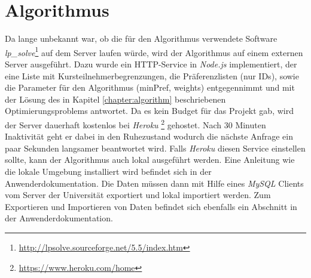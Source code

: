     \section{Algorithmus}
	Da lange unbekannt war, ob die für den Algorithmus verwendete Software \textit{lp\_solve}\footnote{\href{http://lpsolve.sourceforge.net/5.5/index.htm}{http://lpsolve.sourceforge.net/5.5/index.htm}} auf dem Server laufen würde, wird der Algorithmus auf einem externen Server ausgeführt. 
    Dazu wurde ein HTTP-Service in \textit{Node.js} implementiert, der eine Liste mit Kursteilnehmerbegrenzungen, die Präferenzlisten (nur IDs), sowie die Parameter für den Algorithmus (minPref, weights) entgegennimmt und mit der Lösung des in Kapitel \ref{chapter:algorithm} beschriebenen Optimierungsproblems antwortet.	
    Da es kein Budget für das Projekt gab, wird der Server dauerhaft kostenlos bei \textit{Heroku} \footnote{\href{https://www.heroku.com/home}{https://www.heroku.com/home}} gehostet. 
    Nach 30 Minuten Inaktivität geht er dabei in den Ruhezustand wodurch die nächste Anfrage ein paar Sekunden langsamer beantwortet wird. 
    Falls \textit{Heroku} diesen Service einstellen sollte, kann der Algorithmus auch lokal ausgeführt werden. 
    Eine Anleitung wie die lokale Umgebung installiert wird befindet sich in der Anwenderdokumentation. 
    Die Daten müssen dann mit Hilfe eines \textit{MySQL} Clients vom Server der Universität exportiert und lokal importiert werden. 
    Zum Exportieren und Importieren von Daten befindet sich ebenfalls ein Abschnitt in der Anwenderdokumentation. 
    
    
    
    
    
